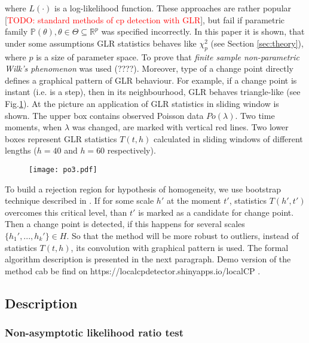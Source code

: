 where $L(\cdot)$ is a log-likelihood function. %
These approaches are rather popular [\textcolor{red}{TODO: standard methods of cp detection with GLR}], but fail if parametric family $\mathbb{P}(\theta), \theta \in \Theta \subseteq \mathbb{R}^p$ was specified incorrectly. In this paper it is shown, that under some assumptions GLR statistics behaves like $\chi^2_p$ (see Section \ref{sec:theory}), where $p$ is a size of parameter space. To prove that \textit{finite sample non-parametric Wilk's phenomenon} was used \cite{wilks2013} (????).
Moreover, type of a change point directly defines a graphical pattern of GLR behaviour. For example, if a change point is instant (i.e. is a step), then in its neighbourhood, GLR behaves triangle-like (see Fig.\ref{fig:triangle}). At the picture an application of GLR statistics in sliding window is shown. The upper box contains observed Poisson data $Po(\lambda)$. Two time moments, when $\lambda$ was changed, are marked with vertical red lines. Two lower boxes represent GLR statistics $T(t,h)$ calculated in sliding windows of different lengths ($h = 40$ and $h =  60$ respectively). 

\begin{figure}[!h]
    \centering
    \texttt{[image: po3.pdf]}
    \label{fig:triangle}
\end{figure}

To build a rejection region for hypothesis of homogeneity, we use bootstrap technique described in \cite{Bootstrap}. If for some scale $h'$ at the moment $t'$, statistics $T(h', t')$ overcomes this critical level, than $t'$ is marked as a candidate for change point. Then a change point is detected, if this happens for several scales $\{h_1',..., h_k'\} \in H$. So that the method will be more robust to outliers, instead of statistics $T(t, h)$, its convolution with graphical pattern is used. The formal algorithm description is presented in the next paragraph. Demo version of the method cab be find on https://localcpdetector.shinyapps.io/localCP .


\subsection{Description}

\subsubsection{Non-asymptotic likelihood ratio test}



